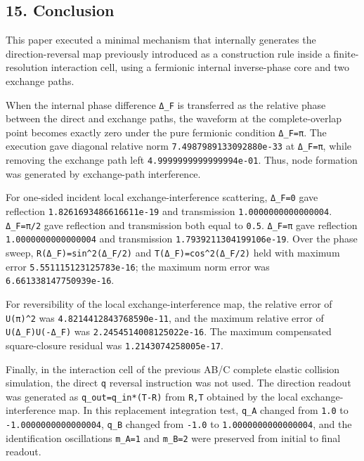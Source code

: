 \documentclass[
  a4paper,
]{article}
\begin{document}
\subsection{15. Conclusion}\label{conclusion}

This paper executed a minimal mechanism that internally generates the
direction-reversal map previously introduced as a construction rule
inside a finite-resolution interaction cell, using a fermionic internal
inverse-phase core and two exchange paths.

When the internal phase difference \texttt{Δ\_F} is transferred as the
relative phase between the direct and exchange paths, the waveform at
the complete-overlap point becomes exactly zero under the pure fermionic
condition \texttt{Δ\_F=π}. The execution gave diagonal relative norm
\texttt{7.4987989133092880e-33} at \texttt{Δ\_F=π}, while removing the
exchange path left \texttt{4.9999999999999994e-01}. Thus, node formation
was generated by exchange-path interference.

For one-sided incident local exchange-interference scattering,
\texttt{Δ\_F=0} gave reflection \texttt{1.8261693486616611e-19} and
transmission \texttt{1.0000000000000004}. \texttt{Δ\_F=π/2} gave
reflection and transmission both equal to \texttt{0.5}. \texttt{Δ\_F=π}
gave reflection \texttt{1.0000000000000004} and transmission
\texttt{1.7939211304199106e-19}. Over the phase sweep,
\texttt{R(Δ\_F)=sin\^{}2(Δ\_F/2)} and \texttt{T(Δ\_F)=cos\^{}2(Δ\_F/2)}
held with maximum error \texttt{5.551115123125783e-16}; the maximum norm
error was \texttt{6.661338147750939e-16}.

For reversibility of the local exchange-interference map, the relative
error of \texttt{U(π)\^{}2} was \texttt{4.8214412843768590e-11}, and the
maximum relative error of \texttt{U(Δ\_F)U(-Δ\_F)} was
\texttt{2.2454514008125022e-16}. The maximum compensated square-closure
residual was \texttt{1.2143074258005e-17}.

Finally, in the interaction cell of the previous AB/C complete elastic
collision simulation, the direct \texttt{q} reversal instruction was not
used. The direction readout was generated as \texttt{q\_out=q\_in*(T-R)}
from \texttt{R,T} obtained by the local exchange-interference map. In
this replacement integration test, \texttt{q\_A} changed from
\texttt{1.0} to \texttt{-1.0000000000000004}, \texttt{q\_B} changed from
\texttt{-1.0} to \texttt{1.0000000000000004}, and the identification
oscillations \texttt{m\_A=1} and \texttt{m\_B=2} were preserved from
initial to final readout.
\end{document}
